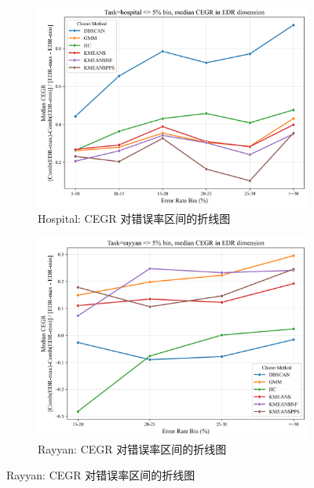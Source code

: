 \documentclass[10pt]{article} %
\numberwithin{equation}{section}
\begin{document}
\begin{enumerate}[label=(\alph*)]
\begin{figure}[htbp]
    \vspace{1em} %

    \begin{subfigure}[b]{0.45\linewidth}
        \centering
        \includegraphics[width=\linewidth]{figures/line graph/CEGR_5pct_hospital.png}
        \caption{Hospital: CEGR 对错误率区间的折线图}
        \label{fig:cegr_hospital}
    \end{subfigure}
    \hfill
    \begin{subfigure}[b]{0.45\linewidth}
        \centering
        \includegraphics[width=\linewidth]{figures/line graph/CEGR_5pct_rayyan.png}
        \caption{Rayyan: CEGR 对错误率区间的折线图}
        \label{fig:cegr_rayyan}
    \end{subfigure}


\end{figure}
\end{enumerate}
\end{document}
